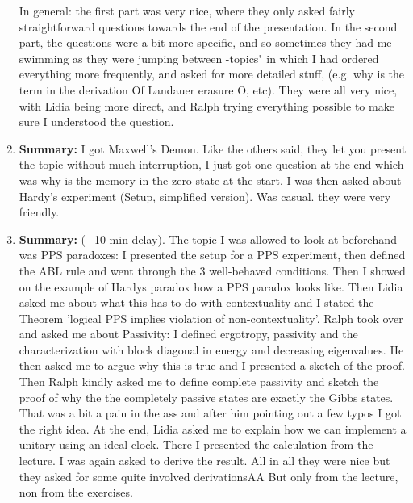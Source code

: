 \documentclass{article}%
\begin{document}
\begin{enumerate}
In general: the first part was very nice, where they only asked fairly straightforward questions towards the end of the presentation. In the second part, the questions were a bit more specific, and so sometimes they had me swimming as they were jumping between {-}topics" in which I had ordered everything more frequently, and asked for more detailed stuff, (e.g. why is the term in the derivation Of Landauer erasure O, etc).\newline%
They were all very nice, with Lidia being more direct, and Ralph trying everything possible to make sure I understood the question.%
\item%
\begin{mycolorbox}%
\textbf{Summary:}%
\newline%
I got Maxwell's Demon. Like the others said, they let you present the topic without much interruption, I just got one question at the end which was why is the memory in the zero state at the start. I was then asked about Hardy's experiment (Setup, simplified version). Was casual. they were very friendly.%
\end{mycolorbox}%
\item%
\textbf{Summary:}%
\newline%
(+10 min delay). The topic I was allowed to look at beforehand was PPS paradoxes: I presented the setup for a PPS experiment, then defined the ABL rule and went through the 3 well{-}behaved conditions. Then I showed on the example of Hardys paradox how a PPS paradox looks like.\newline%
Then Lidia asked me about what this has to do with contextuality and I stated the Theorem 'logical PPS implies violation of non{-}contextuality'.\newline%
Ralph took over and asked me about Passivity: I defined ergotropy, passivity and the characterization with block diagonal in energy and decreasing eigenvalues. He then asked me to argue why this is true and I presented a sketch of the proof. Then Ralph kindly asked me to define complete passivity and sketch the proof of why the the completely passive states are exactly the Gibbs states. That was a bit a pain in the ass and after him pointing out a few typos I got the right idea. At the end, Lidia asked me to explain how we can implement a unitary using an ideal clock. There I presented the calculation from the lecture. I was again asked to derive the result.\newline%
All in all they were nice but they asked for some quite involved derivationsAA But only from the lecture, non from the exercises.%

\end{enumerate}
\end{document}
